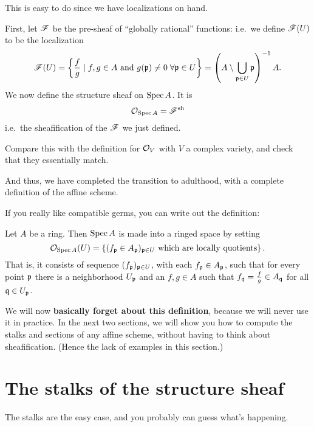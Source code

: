This is easy to do since we have localizations on hand.
\begin{definition}
	First, let $\mathscr F$ be the pre-sheaf of ``globally rational'' functions:
	i.e.\ we define $\mathscr F(U)$ to be the localization
	\[
		\mathscr F(U) = \left\{
			\frac fg \mid f, g \in A
			\text{ and } g(\mathfrak p) \neq 0 \; \forall \mathfrak p \in U
		\right\}
		= \left(A \setminus \bigcup_{\mathfrak p \in U} \mathfrak p \right)^{-1} A.
	\]
	We now define the structure sheaf on $\operatorname{Spec} A$.
	It is
	\[ \mathcal O_{\operatorname{Spec} A} = \mathscr F^\mathrm{sh} \]
	i.e.\ the sheafification of the $\mathscr F$ we just defined.
\end{definition}
\begin{exercise}
	Compare this with the definition for $\mathcal O_V$
	with $V$ a complex variety, and check that they essentially match.
\end{exercise}
And thus, we have completed the transition to adulthood,
with a complete definition of the affine scheme.

If you really like compatible germs,
you can write out the definition:
\begin{definition}
	Let $A$ be a ring.
	Then $\operatorname{Spec} A$ is made into a ringed space by setting
	\[ \mathcal O_{\operatorname{Spec} A}(U)
		= \left\{ (f_\mathfrak p \in A_\mathfrak p)_{\mathfrak p \in U}
		\text{ which are locally quotients} \right\}. \]
	That is, it consists of sequence $(f_\mathfrak p)_{\mathfrak p \in U}$, with
	each $f_\mathfrak p \in A_\mathfrak p$, such that for every point $\mathfrak p$ there
	is a neighborhood $U_\mathfrak p$ and an $f,g \in A$ such that
	$f_\mathfrak q = \frac fg \in A_\mathfrak q$ for all $\mathfrak q \in U_\mathfrak p$.
\end{definition}

We will now \textbf{basically forget about this definition},
because we will never use it in practice.
In the next two sections, we will show you how to compute
the stalks and sections of any affine scheme, without having
to think about sheafification.
(Hence the lack of examples in this section.)

\section{The stalks of the structure sheaf}
The stalks are the easy case,
and you probably can guess what's happening.

